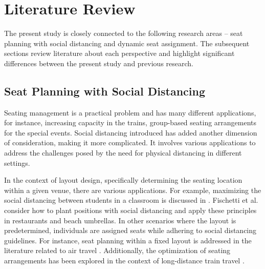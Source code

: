 \section{Literature Review}
The present study is closely connected to the following research areas -- seat planning with social distancing and dynamic seat assignment. The subsequent sections review literature about each perspective and highlight significant differences between the present study and previous research.







\subsection{Seat Planning with Social Distancing}
Seating management is a practical problem and has many different applications, for instance, increasing capacity in the trains, group-based seating arrangements for the special events. Social distancing introduced has added another dimension of consideration, making it more complicated. It involves various applications to address the challenges posed by the need for physical distancing in different settings.


In the context of layout design, specifically determining the seating location within a given venue, there are various applications. For example, maximizing the social distancing between students in a classroom is discussed in \cite{bortolete2022support}. Fischetti et al.\cite{fischetti2023safe} consider how to plant positions with social distancing and apply these principles in restaurants and beach umbrellas. In other scenarios where the layout is predetermined, individuals are assigned seats while adhering to social distancing guidelines. For instance, seat planning within a fixed layout is addressed in the literature related to air travel \cite{ghorbani2020model, salari2022social}. Additionally, the optimization of seating arrangements has been explored in the context of long-distance train travel \cite{haque2022optimization}.

